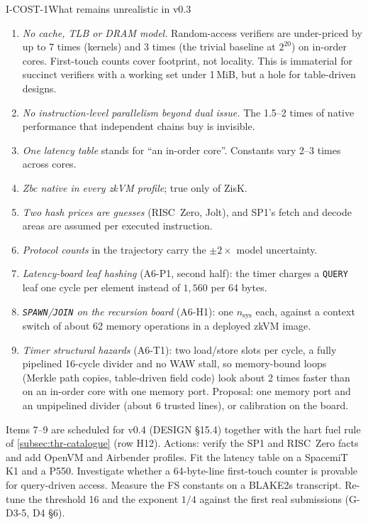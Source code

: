 \begin{issue}{I-COST-1}{What remains unrealistic in v0.3}
\begin{enumerate}[nosep]
\item \emph{No cache, TLB or DRAM model.} Random-access verifiers are under-priced by up to 7 times
  (kernels) and 3 times (the trivial baseline at $2^{20}$) on in-order cores. First-touch counts cover
  footprint, not locality. This is immaterial for succinct verifiers with a working set under 1\,MiB,
  but a hole for table-driven designs.
\item \emph{No instruction-level parallelism beyond dual issue.} The 1.5--2 times of native performance
  that independent chains buy is invisible.
\item \emph{One latency table} stands for \enquote{an in-order core}. Constants vary 2--3 times across
  cores.
\item \emph{Zbc native in every zkVM profile}; true only of ZisK.
\item \emph{Two hash prices are guesses} (RISC~Zero, Jolt), and SP1's fetch and decode areas are
  assumed per executed instruction.
\item \emph{Protocol counts} in the trajectory carry the $\pm2\times$ model uncertainty.
\item \emph{Latency-board leaf hashing} (A6-P1, second half): the timer charges a \texttt{QUERY}
  leaf one cycle per element instead of $1{,}560$ per 64 bytes.
\item \emph{\texttt{SPAWN}/\texttt{JOIN} on the recursion board} (A6-H1): one $n_{\mathrm{sys}}$
  each, against a context switch of about 62 memory operations in a deployed zkVM image.
\item \emph{Timer structural hazards} (A6-T1): two load/store slots per cycle, a fully pipelined
  16-cycle divider and no WAW stall, so memory-bound loops (Merkle path copies, table-driven field
  code) look about 2 times faster than on an in-order core with one memory port. Proposal: one
  memory port and an unpipelined divider (about 6 trusted lines), or calibration on the board.
\end{enumerate}
Items 7--9 are scheduled for v0.4 (DESIGN §15.4) together with the hart fuel rule of
\cref{subsec:thr-catalogue} (row H12).
Actions: verify the SP1 and RISC~Zero facts and add OpenVM and Airbender profiles. Fit the latency
table on a SpacemiT K1 and a P550. Investigate whether a 64-byte-line first-touch counter is provable
for query-driven access. Measure the FS constants on a BLAKE2s transcript. Re-tune the threshold 16
and the exponent $1/4$ against the first real submissions (G-D3-5, D4 §6).
\end{issue}
